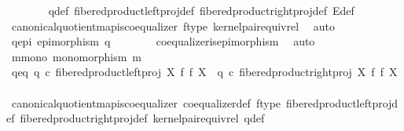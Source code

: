 \begin{isabellebody}
\ \ \ \ \ \ \isamarkupfalse%
\ q{\isacharunderscore}{\kern0pt}def\ fibered{\isacharunderscore}{\kern0pt}product{\isacharunderscore}{\kern0pt}left{\isacharunderscore}{\kern0pt}proj{\isacharunderscore}{\kern0pt}def\ fibered{\isacharunderscore}{\kern0pt}product{\isacharunderscore}{\kern0pt}right{\isacharunderscore}{\kern0pt}proj{\isacharunderscore}{\kern0pt}def\ E{\isacharunderscore}{\kern0pt}def\isanewline
\ \ \ \ \ \ \isamarkupfalse%
\ canonical{\isacharunderscore}{\kern0pt}quotient{\isacharunderscore}{\kern0pt}map{\isacharunderscore}{\kern0pt}is{\isacharunderscore}{\kern0pt}coequalizer\ f{\isacharunderscore}{\kern0pt}type\ kernel{\isacharunderscore}{\kern0pt}pair{\isacharunderscore}{\kern0pt}equiv{\isacharunderscore}{\kern0pt}rel\ \isamarkupfalse%
\ auto\ \isanewline
\ \ \ \ \isamarkupfalse%
\ \isamarkupfalse%
\ q{\isacharunderscore}{\kern0pt}epi{\isacharcolon}{\kern0pt}\ {\isachardoublequoteopen}epimorphism\ q{\isachardoublequoteclose}\isanewline
\ \ \ \ \ \ \isamarkupfalse%
\ coequalizer{\isacharunderscore}{\kern0pt}is{\isacharunderscore}{\kern0pt}epimorphism\ \isamarkupfalse%
\ auto\ \isanewline
\isanewline
\ \ \ \ \isamarkupfalse%
\ m{\isacharunderscore}{\kern0pt}mono{\isacharcolon}{\kern0pt}\ {\isachardoublequoteopen}monomorphism\ m{\isachardoublequoteclose}\isanewline
\ \ \ \ \isamarkupfalse%
\ {\isacharminus}{\kern0pt}\isanewline
\ \ \ \ \ \ \isamarkupfalse%
\ q{\isacharunderscore}{\kern0pt}eq{\isacharcolon}{\kern0pt}\ {\isachardoublequoteopen}q\ {\isasymcirc}\isactrlsub c\ fibered{\isacharunderscore}{\kern0pt}product{\isacharunderscore}{\kern0pt}left{\isacharunderscore}{\kern0pt}proj\ X\ f\ f\ X\ {\isacharequal}{\kern0pt}\ q\ {\isasymcirc}\isactrlsub c\ fibered{\isacharunderscore}{\kern0pt}product{\isacharunderscore}{\kern0pt}right{\isacharunderscore}{\kern0pt}proj\ X\ f\ f\ X{\isachardoublequoteclose}\isanewline
\ \ \ \ \ \ \ \ \isamarkupfalse%
\ canonical{\isacharunderscore}{\kern0pt}quotient{\isacharunderscore}{\kern0pt}map{\isacharunderscore}{\kern0pt}is{\isacharunderscore}{\kern0pt}coequalizer\ coequalizer{\isacharunderscore}{\kern0pt}def\ f{\isacharunderscore}{\kern0pt}type\ fibered{\isacharunderscore}{\kern0pt}product{\isacharunderscore}{\kern0pt}left{\isacharunderscore}{\kern0pt}proj{\isacharunderscore}{\kern0pt}def\ fibered{\isacharunderscore}{\kern0pt}product{\isacharunderscore}{\kern0pt}right{\isacharunderscore}{\kern0pt}proj{\isacharunderscore}{\kern0pt}def\ kernel{\isacharunderscore}{\kern0pt}pair{\isacharunderscore}{\kern0pt}equiv{\isacharunderscore}{\kern0pt}rel\ q{\isacharunderscore}{\kern0pt}def\ \isamarkupfalse%

\end{isabellebody}
